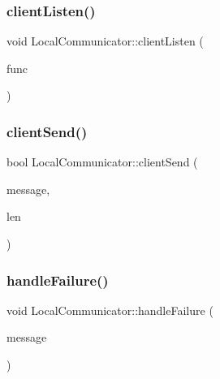 \subsubsection{\texorpdfstring{client\+Listen()}{clientListen()}}
{\footnotesize\ttfamily void Local\+Communicator\+::client\+Listen (\begin{DoxyParamCaption}\item[{std\+::function$<$ void(\hyperlink{structcubiumClientSocket__t}{cubium\+Client\+Socket\+\_\+t} $\ast$)$>$}]{func }\end{DoxyParamCaption})}

\mbox{\label{classLocalCommunicator_afca7f865eda5dca2fc4c3bf5ca697ab8}} 
\subsubsection{\texorpdfstring{client\+Send()}{clientSend()}}
{\footnotesize\ttfamily bool Local\+Communicator\+::client\+Send (\begin{DoxyParamCaption}\item[{\hyperlink{structSpaMessage}{Spa\+Message} $\ast$}]{message,  }\item[{ssize\+\_\+t}]{len }\end{DoxyParamCaption})\hspace{0.3cm}{\ttfamily [virtual]}}

\mbox{\label{classLocalCommunicator_a0d6816af83fd55a79990f0b8caa4e164}} 
\subsubsection{\texorpdfstring{handle\+Failure()}{handleFailure()}}
{\footnotesize\ttfamily void Local\+Communicator\+::handle\+Failure (\begin{DoxyParamCaption}\item[{std\+::string}]{message }\end{DoxyParamCaption})\hspace{0.3cm}{\ttfamily [virtual]}}

\mbox{\label{classLocalCommunicator_a8ed10b0a1f9be12597a2e095b7b8fb3e}} 
